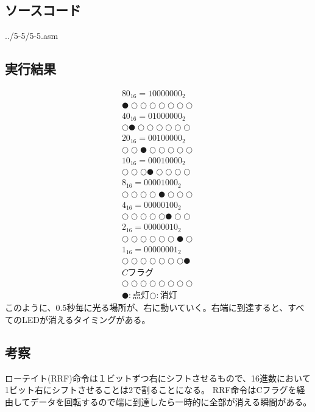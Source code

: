 \documentclass[a4paper,12pt]{ujarticle}
\begin{document}
  \subsection{ソースコード}
   \begin{lstinputlisting}[basicstyle=\ttfamily\footnotesize, frame=single]
    {../5-5/5-5.asm}
   \end{lstinputlisting}
  \subsection{実行結果}
  \begin{eqnarray*}
   {80}_{16} = 10000000_2 \\
   ●○○○○○○○ \\
   {40}_{16} = 01000000_2 \\
   ○●○○○○○○ \\
   {20}_{16} = 00100000_2 \\
   ○○●○○○○○ \\
   {10}_{16} = 00010000_2 \\
   ○○○●○○○○ \\
   {8}_{16}  = 00001000_2 \\
   ○○○○●○○○ \\
   {4}_{16}  = 00000100_2 \\
   ○○○○○●○○ \\
   {2}_{16}  = 00000010_2 \\
   ○○○○○○●○ \\
   {1}_{16}  = 00000001_2 \\
   ○○○○○○○● \\
   Cフラグ \\
   ○○○○○○○○ \\
   ●:点灯○:消灯
  \end{eqnarray*}
  このように、0.5秒毎に光る場所が、右に動いていく。右端に到達すると、すべてのLEDが消えるタイミングがある。
  \subsection{考察}
  ローテイト(RRF)命令は１ビットずつ右にシフトさせるもので、16進数において1ビット右にシフトさせることは2で割ることになる。
  RRF命令はCフラグを経由してデータを回転するので端に到達したら一時的に全部が消える瞬間がある。
\end{document}
